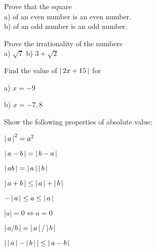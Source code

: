 \documentclass[11pt]{amsbook}
\begin{document}
\begin{exercise}
\label{ex:01:006}
	Prove that the square\\  
	a) of an even number is an even number.\\
	b) of an odd number is an odd number.
\end{exercise}
\begin{exercise}
\label{ex:01:007}
	Prove the irrationality of the numbers\\ 
	a) $\sqrt{7}$
	\quad \quad
	b) $3 + \sqrt{2}$
\end{exercise}
\begin{exercise}
\label{ex:01:008}
	Find the value of $\left \lvert \, 2x+15 \, \right \rvert$ for  
	\begin{multicols}{2}{
	a) $x = -9$
	
	b) $x = -7,8$
	}
	\end{multicols}
\end{exercise}
%		





\begin{exercise}
\label{ex:01:009}
	Show the following properties of absolute value:
	\begin{hbColi}{2}
		\item $\left \lvert \, a \, \right \rvert^{2} = a^{2} $
		\item $\left \lvert \, a - b \, \right \rvert = \left \lvert \, b - a \, \right \rvert$
		\item $\left \lvert \, a b \, \right \rvert = \left \lvert \, a \, \right \rvert \left \lvert \, b \, \right \rvert$
		\item $\left \lvert \, a + b \, \right \rvert \leq \left \lvert \, a \, \right \rvert + \left \lvert \, b \, \right \rvert$
		\item $-\left \lvert \, a \, \right \rvert \leq a \leq \left \lvert \, a \, \right \rvert $
		\item $|a|= 0 \Leftrightarrow a = 0 $
		\item $\left \lvert \, a / b \, \right \rvert = \left \lvert \, a \, \right \rvert / \left \lvert \, b \, \right \rvert$
		\item $\left \lvert \, \left \lvert \, a \, \right \rvert - \left \lvert \, b \, \right \rvert \, \right \rvert \leq \left \lvert \, a - b \, \right \rvert$
	\end{hbColi}
\end{exercise}
\end{document}
